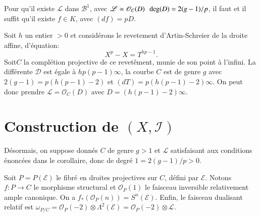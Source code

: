 \begin{corollaire*}
Pour qu'il existe $\mathscr{L}$ dans $\mathscr{B}^{1}$, avec
$\mathscr{L}\simeq \mathscr{O}_{C}(D)~~\deg\break (D)=2(g-1)/p$, il faut et il
suffit qu'il existe $f\in K$, avec $(df)=pD$.
\end{corollaire*}

\begin{exemple*}
Soit $h$ un entier $>0$ et consid\'erons le revetement
d'Artin-Schreier de la droite affine, d'\'equation:
$$
X^{p}-X=T^{hp-1}.
$$
Soit\pageoriginale $C$ la compl\'etion projective de ce revet\^ement,
munie de son point \`a l'infini. La diff\'erente $\mathscr{D}$
est \'egale \`a $hp(p-1)\infty$, la courbe $C$ est de genre $g$ avec
$2(g-1)=p(h(p-1)-2)$ et $(dT)=p(h(p-1)-2)\infty$. On peut donc prendre
$\mathscr{L}=\mathscr{O}_{C}(D)$ avec $D=(h(p-1)-2)\infty$. 
\end{exemple*}

\section{Construction de \texorpdfstring{$(X,\mathscr{I})$}{XI}}\label{art03-sec2}

D\'esormais, on suppose donn\'es $C$ de genre $g>1$ et $\mathscr{L}$
satisfaisant aux conditions \'enonc\'ees dans le corollaire, donc de
degr\'e $1=2(g-1)/p>0$.

Soit $P=P(\mathscr{E})$ le fibr\'e en droites projectives sur $C$,
d\'efini par $\mathscr{E}$. Notons $f:P\to C$ le morphisme structural
et $\mathscr{O}_{P}(1)$ le faisceau inversible relativement ample
canonique. On a $f_{*}(\mathscr{O}_{P}(n))=S^{n}(\mathscr{E})$. Enfin,
le faisceau dualisant relatif est
$\omega_{P/C}=\mathscr{O}_{P}(-2)\otimes \Lambda^{2}(\mathscr{E})=\mathscr{O}_{P}(-2)\otimes \mathscr{L}$.

